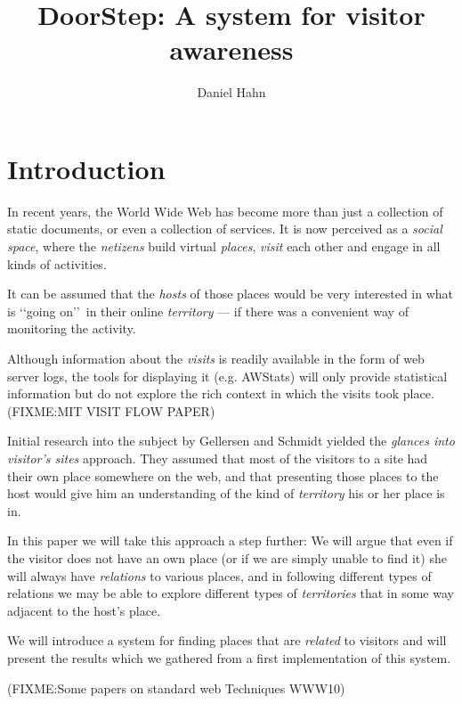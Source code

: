 \documentclass[a4paper]{danarticle}
\theoremstyle{remark}
\begin{document}
  \author{Daniel Hahn}
  \title{DoorStep: A system for visitor awareness}
  \maketitle
  
  \section{Introduction}
    In recent years, the World Wide Web has become more than just a collection
    of static documents, or even a collection of services. It is now perceived
    as a \textit{social space}, where the \textit{netizens} build virtual
    \textit{places}, \textit{visit} each other and engage in all kinds of
    activities.
    
    It can be assumed that the \textit{hosts} of those places would be
    very interested in what is \lq\lq going on\rq\rq\ in their online
    \textit{territory} --- if
    there was a convenient way of monitoring the activity. 
    
    Although
    information about the \textit{visits} is readily available in the
    form of web server logs, the tools for displaying it (e.g. AWStats) will only
    provide statistical information but do not explore the rich context in which
    the visits took place. (FIXME:MIT VISIT FLOW PAPER)
    
    Initial research into the subject by Gellersen and Schmidt\cite{webaware}
    yielded the
    \textit{glances into visitor's sites} approach. They assumed that most of
    the visitors to a site had their own place somewhere on the web, and that
    presenting those places to the host would give him an understanding of the
    kind of \textit{territory} his or her place is in.
    
    In this paper we will take this approach a step further: We will argue that
    even if the visitor does not have an own place (or if we are
    simply unable to find it) she will always have \textit{relations} to various
    places, and in following different types of relations we may be able to
    explore different types of \textit{territories} that in some way adjacent to
    the host's place.
    
    We will introduce a system for finding places that are \textit{related} to
    visitors and will present the results which we gathered from a first
    implementation of this system.
    
    (FIXME:Some papers on standard web Techniques WWW10)
\end{document}
